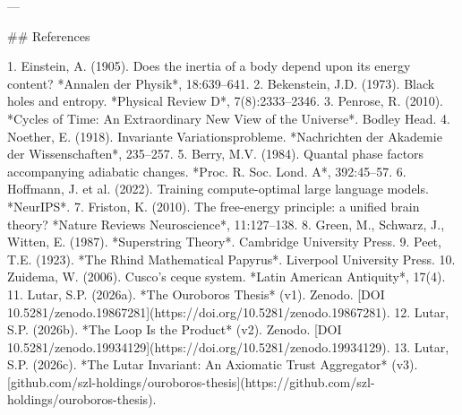---

## References

1. Einstein, A. (1905). Does the inertia of a body depend upon its energy content? *Annalen der Physik*, 18:639--641.
2. Bekenstein, J.D. (1973). Black holes and entropy. *Physical Review D*, 7(8):2333--2346.
3. Penrose, R. (2010). *Cycles of Time: An Extraordinary New View of the Universe*. Bodley Head.
4. Noether, E. (1918). Invariante Variationsprobleme. *Nachrichten der Akademie der Wissenschaften*, 235--257.
5. Berry, M.V. (1984). Quantal phase factors accompanying adiabatic changes. *Proc. R. Soc. Lond. A*, 392:45--57.
6. Hoffmann, J. et al. (2022). Training compute-optimal large language models. *NeurIPS*.
7. Friston, K. (2010). The free-energy principle: a unified brain theory? *Nature Reviews Neuroscience*, 11:127--138.
8. Green, M., Schwarz, J., Witten, E. (1987). *Superstring Theory*. Cambridge University Press.
9. Peet, T.E. (1923). *The Rhind Mathematical Papyrus*. Liverpool University Press.
10. Zuidema, W. (2006). Cusco's ceque system. *Latin American Antiquity*, 17(4).
11. Lutar, S.P. (2026a). *The Ouroboros Thesis* (v1). Zenodo. [DOI 10.5281/zenodo.19867281](https://doi.org/10.5281/zenodo.19867281).
12. Lutar, S.P. (2026b). *The Loop Is the Product* (v2). Zenodo. [DOI 10.5281/zenodo.19934129](https://doi.org/10.5281/zenodo.19934129).
13. Lutar, S.P. (2026c). *The Lutar Invariant: An Axiomatic Trust Aggregator* (v3). [github.com/szl-holdings/ouroboros-thesis](https://github.com/szl-holdings/ouroboros-thesis).

